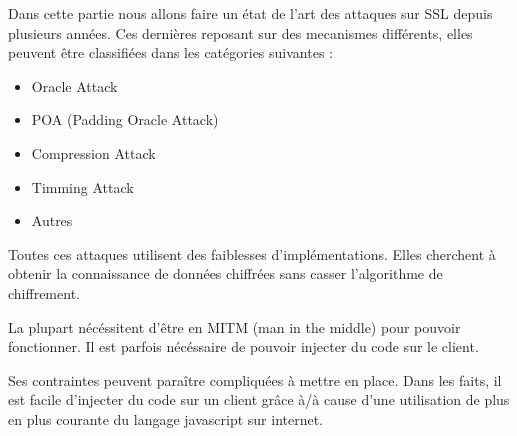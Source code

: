 Dans cette partie nous allons faire un état de l'art des attaques sur SSL depuis plusieurs années.
Ces dernières reposant sur des mecanismes différents, elles peuvent être classifiées dans les catégories suivantes :

\begin{itemize}
\item Oracle Attack
\item POA (Padding Oracle Attack)
\item Compression Attack
\item Timming Attack
\item Autres
\end{itemize}

Toutes ces attaques utilisent des faiblesses d'implémentations.
Elles cherchent à obtenir la connaissance de données chiffrées
sans casser l'algorithme de chiffrement. 

La plupart nécéssitent d'être en MITM (man in the middle) pour pouvoir
fonctionner. Il est parfois nécéssaire de pouvoir injecter du code 
sur le client.

Ses contraintes peuvent paraître compliquées à mettre en place.
Dans les faits, il est facile d'injecter du code sur un client
grâce à/à cause d'une utilisation de plus en plus courante du langage
javascript sur internet.
